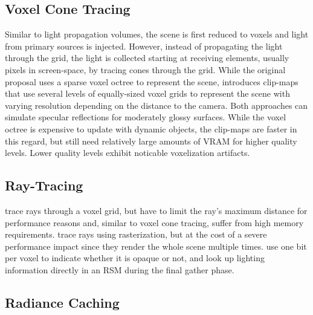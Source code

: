 \subsection{Voxel Cone Tracing}

Similar to light propagation volumes, the scene is first reduced to voxels and light from primary sources is injected. However, instead of propagating the light through the grid, the light is collected starting at receiving elements, usually pixels in screen-space, by tracing cones through the grid.
While the original proposal \citep{Crassin:2012:OctreeVCT} uses a sparse voxel octree to represent the scene, \citet{Panteleev:2015:VXGI} introduces clip-maps that use several levels of equally-sized voxel grids to represent the scene with varying resolution depending on the distance to the camera.
Both approaches can simulate specular reflections for moderately glossy surfaces. While the voxel octree is expensive to update with dynamic objects, the clip-maps are faster in this regard, but still need relatively large amounts of VRAM for higher quality levels. Lower quality levels exhibit noticable voxelization artifacts.


\subsection{Ray-Tracing}

\citet{Thiedemann:2011:VGI} trace rays through a voxel grid, but have to limit the ray's maximum distance for performance reasons and, similar to voxel cone tracing, suffer from high memory requirements.
\citet{Tokuyoshi:2012:pathtracingrasterization} trace rays using rasterization, but at the cost of a severe performance impact since they render the whole scene multiple times.
\citet{Chen:2016:Compactvoxels} use one bit per voxel to indicate whether it is opaque or not, and look up lighting information directly in an RSM during the final gather phase.



\subsection{Radiance Caching}

